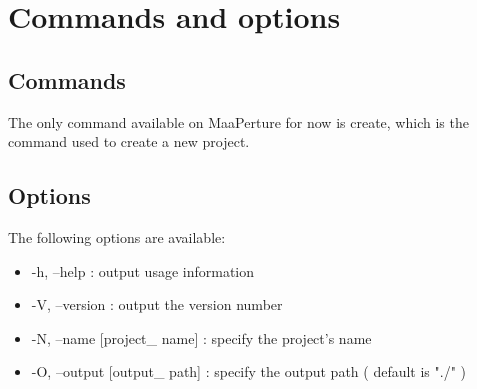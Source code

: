 \section{Commands and options}

\subsection{Commands}
\label{commands}
The only command available on MaaPerture for now is create, which is the command used to create a new project.

\subsection{Options}
\label{options}
The following options are available:
\begin{itemize}
\item -h, --help    :              output usage information
\item -V, --version  :             output the version number
\item -N, --name [project\_ name] :  specify the project's name
\item -O, --output [output\_ path] : specify the output path ( default is "./" )
\end{itemize}


